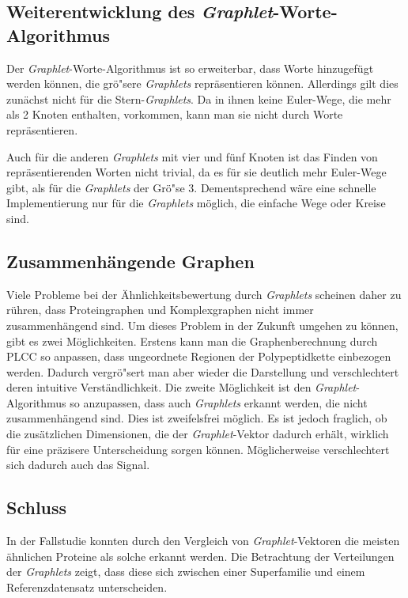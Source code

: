 \documentclass{report}
\begin{document}
\subsection{Weiterentwicklung des \textit{Graphlet}-Worte-Algorithmus}

Der \textit{Graphlet}-Worte-Algorithmus ist so erweiterbar, dass Worte hinzugef\"ugt werden k\"onnen, die gr\"o"sere \textit{Graphlets} repr\"asentieren k\"onnen. Allerdings gilt dies zun\"achst nicht f\"ur die Stern-\textit{Graphlets}. Da in ihnen keine Euler-Wege, die mehr als 2 Knoten enthalten, vorkommen, kann man sie nicht durch Worte repr\"asentieren.


Auch f\"ur die anderen \textit{Graphlets} mit vier und f\"unf Knoten ist das Finden von repr\"asentierenden Worten nicht trivial, da es f\"ur sie deutlich mehr Euler-Wege gibt, als f\"ur die \textit{Graphlets} der Gr\"o"se 3.
Dementsprechend w\"are eine schnelle Implementierung nur f\"ur die \textit{Graphlets} m\"oglich, die einfache Wege oder Kreise sind.

\subsection{Zusammenh\"angende Graphen}

Viele Probleme bei der \"Ahnlichkeitsbewertung durch \textit{Graphlets} scheinen daher zu r\"uhren, dass Proteingraphen und Komplexgraphen nicht immer zusammenh\"angend sind.
Um dieses Problem in der Zukunft umgehen zu k\"onnen, gibt es zwei M\"oglichkeiten.
Erstens kann man die Graphenberechnung durch PLCC so anpassen, dass ungeordnete Regionen der Polypeptidkette einbezogen werden. Dadurch vergr\"o"sert man aber wieder die Darstellung und verschlechtert deren intuitive Verst\"andlichkeit.
Die zweite M\"oglichkeit ist den \textit{Graphlet}-Algorithmus so anzupassen, dass auch \textit{Graphlets} erkannt werden, die nicht zusammenh\"angend sind. Dies ist zweifelsfrei m\"oglich. Es ist jedoch fraglich, ob die zus\"atzlichen Dimensionen, die der \textit{Graphlet}-Vektor dadurch erh\"alt, wirklich f\"ur eine pr\"azisere Unterscheidung sorgen k\"onnen. M\"oglicherweise verschlechtert sich dadurch auch das Signal. 


\subsection{Schluss}

In der Fallstudie konnten durch den Vergleich von \textit{Graphlet}-Vektoren die meisten \"ahnlichen Proteine als solche erkannt werden. Die Betrachtung der Verteilungen der \textit{Graphlets} zeigt, dass diese sich zwischen einer Superfamilie und einem Referenzdatensatz unterscheiden.
\end{document}
